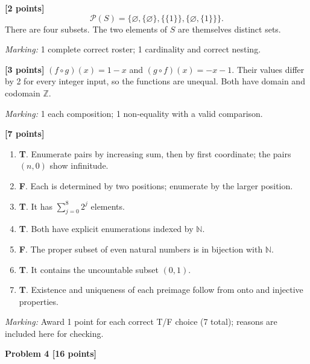\documentclass[12pt,letterpaper]{article}
\newcommand{\problemheading}[2][5\baselineskip]{\Needspace{#1}\par\noindent\hspace*{-0.625in}\textbf{#2}\par\nobreak\vspace{0.3em}}
\begin{document}
\begin{description}[font=\normalfont,leftmargin=1.2em,labelsep=0.4em]
\item[(a)] \textbf{[2 points]} \[\mathcal P(S)=\{\varnothing,\{\varnothing\},\{\{1\}\},\{\varnothing,\{1\}\}\}.\] There are four subsets. The two elements of $S$ are themselves distinct sets.
\par\textit{Marking:} 1 complete correct roster; 1 cardinality and correct nesting.
\item[(b)] \textbf{[3 points]} $(f\circ g)(x)=1-x$ and $(g\circ f)(x)=-x-1$. Their values differ by 2 for every integer input, so the functions are unequal. Both have domain and codomain $\mathbb Z$.
\par\textit{Marking:} 1 each composition; 1 non-equality with a valid comparison.
\item[(c)] \textbf{[7 points]} \begin{enumerate}[label=(\roman*)]\item \textbf{T}. Enumerate pairs by increasing sum, then by first coordinate; the pairs $(n,0)$ show infinitude.\item \textbf{F}. Each is determined by two positions; enumerate by the larger position.\item \textbf{T}. It has $\sum_{j=0}^8 2^j$ elements.\item \textbf{T}. Both have explicit enumerations indexed by $\mathbb N$.\item \textbf{F}. The proper subset of even natural numbers is in bijection with $\mathbb N$.\item \textbf{T}. It contains the uncountable subset $(0,1)$.\item \textbf{T}. Existence and uniqueness of each preimage follow from onto and injective properties.\end{enumerate}
\par\textit{Marking:} Award 1 point for each correct T/F choice (7 total); reasons are included here for checking.
\end{description}
\vspace{0.65em}
\problemheading[\dimexpr 3\baselineskip+4\baselineskip\relax]{Problem 4 [16 points]}
\end{document}
